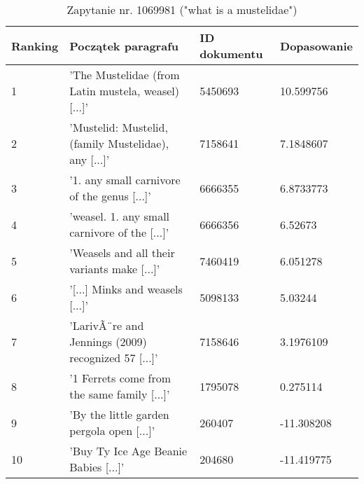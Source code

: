 \begin{table}[htp!]
\centering
\caption{Zapytanie nr. 1069981 ("what is a mustelidae")\protect\footnotemark[2]}
\vspace*{5mm}
\begin{tabular}{llll}
   Ranking & Początek paragrafu & ID dokumentu & Dopasowanie \\
   \hline
    1 & 'The Mustelidae (from Latin mustela, weasel) [...]' & 5450693 & 10.599756 \\
    2 & 'Mustelid: Mustelid, (family Mustelidae), any [...]' & 7158641 &  7.1848607 \\
    3 & '1. any small carnivore of the genus [...]' & 6666355 & 6.8733773 \\
    4 & 'weasel. 1. any small carnivore of the [...]' & 6666356 &  6.52673 \\
    5 & 'Weasels and all their variants make [...]' & 7460419 &  6.051278\\
    6 & '[...] Minks and weasels  [...]' & 5098133 & 5.03244 \\
    7 & 'LarivÃ¨re and Jennings (2009) recognized 57 [...]' & 7158646 & 3.1976109 \\
    8 & '1 Ferrets come from the same family [...]' & 1795078 &  0.275114 \\
    9 & 'By the little garden pergola open [...]' & 260407 &  -11.308208 \\
    10 & 'Buy Ty Ice Age Beanie Babies [...]' & 204680 & -11.419775 \\
\end{tabular}
\end{table}



